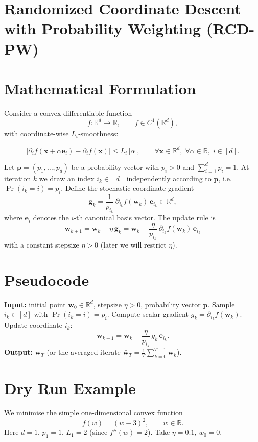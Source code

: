 \documentclass{article}
\newcommand{\R}{\mathbb{R}}
\newcommand{\e}{\mathbf{e}}
\newcommand{\p}{\mathbf{p}}
\newcommand{\w}{\mathbf{w}}
\newcommand{\g}{\mathbf{g}}
\begin{document}
\section*{Randomized Coordinate Descent with Probability Weighting (RCD-PW)}

\section*{Mathematical Formulation}
Consider a convex differentiable function 
\[
f:\R^{d}\rightarrow\R,\qquad f\in C^{1}(\R^{d}),
\]
with coordinate-wise $L_{i}$‑smoothness:

\[
\bigl|\partial_{i}f(\mathbf{x}+ \alpha \mathbf{e}_{i})-\partial_{i}f(\mathbf{x})\bigr|
\le L_{i}\,|\alpha|,\qquad \forall \mathbf{x}\in\R^{d},\;\forall \alpha\in\R,\; i\in[d].
\tag{1}
\]

Let $\p=(p_{1},\dots,p_{d})$ be a probability vector with $p_{i}>0$ and $\sum_{i=1}^{d}p_{i}=1$.
At iteration $k$ we draw an index $i_{k}\in[d]$ independently according to $\p$,
i.e. $\Pr(i_{k}=i)=p_{i}$.  
Define the stochastic coordinate gradient
\[
\g_{k}= \frac{1}{p_{i_{k}}}\,\partial_{i_{k}}f(\w_{k})\,\e_{i_{k}}\in\R^{d},
\tag{2}
\]
where $\e_{i}$ denotes the $i$‑th canonical basis vector.  
The update rule is
\[
\boxed{\;
\w_{k+1}= \w_{k}-\eta\,\g_{k}
      =\w_{k}-\frac{\eta}{p_{i_{k}}}\,\partial_{i_{k}}f(\w_{k})\,\e_{i_{k}}
\;}
\tag{3}
\]
with a constant stepsize $\eta>0$ (later we will restrict $\eta$).

\section*{Pseudocode}
\begin{algorithm}[H]
\caption{Randomized Coordinate Descent with Probability Weighting (RCD‑PW)}
\begin{algorithmic}[1]
\STATE \textbf{Input:} initial point $\w_{0}\in\R^{d}$, stepsize $\eta>0$, probability vector $\p$.
    \STATE Sample $i_{k}\in[d]$ with $\Pr(i_{k}=i)=p_{i}$.
    \STATE Compute scalar gradient $g_{k}= \partial_{i_{k}}f(\w_{k})$.
    \STATE Update coordinate $i_{k}$:
    \[
        \w_{k+1}= \w_{k}-\frac{\eta}{p_{i_{k}}}\,g_{k}\,\e_{i_{k}}.
    \]
\ENDFOR
\STATE \textbf{Output:} $\w_{T}$ (or the averaged iterate $\bar{\w}_{T}= \frac1T\sum_{k=0}^{T-1}\w_{k}$).
\end{algorithmic}
\end{algorithm}

\section*{Dry Run Example}
We minimise the simple one‑dimensional convex function 
\[
f(w)=(w-3)^{2},\qquad w\in\R .
\]
Here $d=1$, $p_{1}=1$, $L_{1}=2$ (since $f''(w)=2$).  
Take $\eta=0.1$, $w_{0}=0$.
\end{document}

